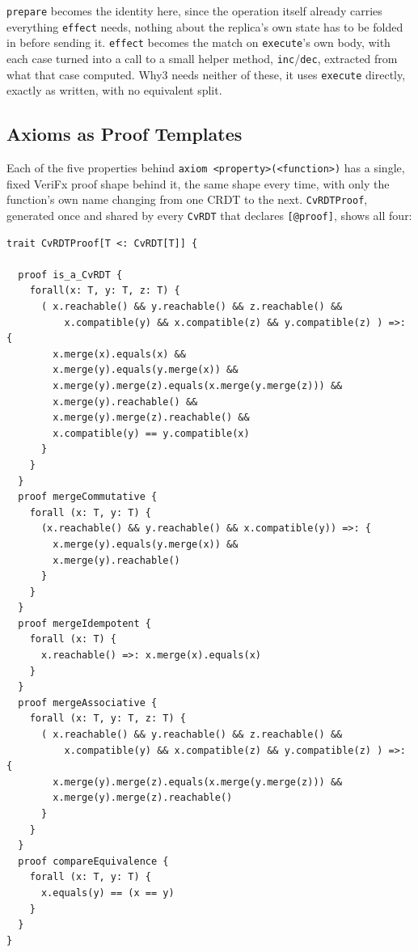\texttt{prepare} becomes the identity here, since the operation itself already carries everything \texttt{effect} needs,
nothing about the replica's own state has to be folded in before sending it. \texttt{effect} becomes the match on
\texttt{execute}'s own body, with each case turned into a call to a small helper method, \texttt{inc}/\texttt{dec},
extracted from what that case computed. Why3 needs neither of these, it uses \texttt{execute} directly, exactly as
written, with no equivalent split.

\subsection{Axioms as Proof Templates}
\label{sub:vfx-proofs}

Each of the five properties behind \texttt{axiom <property>(<function>)} has a single, fixed VeriFx proof shape behind
it, the same shape every time, with only the function's own name changing from one CRDT to the next. \texttt{CvRDTProof},
generated once and shared by every \texttt{CvRDT} that declares \texttt{[@proof]}, shows all four:

\begin{lstlisting}[caption={\texttt{CvRDTProof}, generated once and shared by every \texttt{CvRDT}}, label={lst:vfx-cvrdtproof}]
trait CvRDTProof[T <: CvRDT[T]] {

  proof is_a_CvRDT {
    forall(x: T, y: T, z: T) {
      ( x.reachable() && y.reachable() && z.reachable() &&
          x.compatible(y) && x.compatible(z) && y.compatible(z) ) =>: {
        x.merge(x).equals(x) &&
        x.merge(y).equals(y.merge(x)) &&
        x.merge(y).merge(z).equals(x.merge(y.merge(z))) &&
        x.merge(y).reachable() &&
        x.merge(y).merge(z).reachable() &&
        x.compatible(y) == y.compatible(x)
      }
    }
  }
  proof mergeCommutative {
    forall (x: T, y: T) {
      (x.reachable() && y.reachable() && x.compatible(y)) =>: {
        x.merge(y).equals(y.merge(x)) &&
        x.merge(y).reachable()
      }
    }
  }
  proof mergeIdempotent {
    forall (x: T) {
      x.reachable() =>: x.merge(x).equals(x)
    }
  }
  proof mergeAssociative {
    forall (x: T, y: T, z: T) {
      ( x.reachable() && y.reachable() && z.reachable() &&
          x.compatible(y) && x.compatible(z) && y.compatible(z) ) =>: {
        x.merge(y).merge(z).equals(x.merge(y.merge(z))) &&
        x.merge(y).merge(z).reachable()
      }
    }
  }
  proof compareEquivalence {
    forall (x: T, y: T) {
      x.equals(y) == (x == y)
    }
  }
}
\end{lstlisting}

